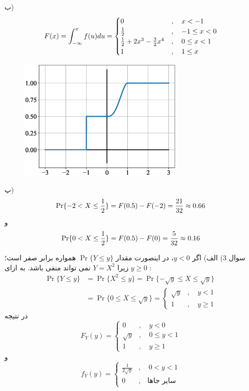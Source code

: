 \documentclass[10pt,letterpaper]{report}
\begin{document}
ب)
$$
F(x)=\int_{-\infty}^xf(u)du=\begin{cases}
0&,\quad x<-1\\
{1\over 2}&,\quad -1\le x<0\\
{1\over 2}+2x^3-{3\over 2}x^4&,\quad 0\le x<1\\
1&,\quad 1\le x
\end{cases}
$$
\begin{figure}[htbp]
\centering
\includegraphics[width=80mm]{CDF_HW9.eps}
\end{figure}

پ)
$$
\Pr\{-2< X\le {1\over2}\}=F(0.5)-F(-2)={21\over 32}\approx0.66
$$
و
$$
\Pr\{0< X\le {1\over2}\}=F(0.5)-F(0)={5\over 32}\approx0.16
$$

سوال 3) الف) اگر $y<0$، در اینصورت مقدار 
$
\Pr\{Y\le y\}
$
همواره برابر صفر است؛ زیرا 
$
Y=X^2
$
نمی تواند منفی باشد. به ازای 
$
y\ge 0
$
:
\[
\begin{split}
\Pr\{Y\le y\}&=\Pr\{X^2\le y\}
=\Pr\{-\sqrt y\le X\le \sqrt y\}
\\&=\Pr\{0\le X\le \sqrt y\}=\begin{cases}
\sqrt y&,\quad y<1\\
1&,\quad y\ge1
\end{cases}
\end{split}
\]
در نتیجه
$$
F_Y(y)=\begin{cases}
0&,\quad y<0\\
\sqrt y&,\quad 0\le y<1\\
1&,\quad y\ge1
\end{cases}
$$
و
$$
f_Y(y)=\begin{cases}
\frac{1}{2\sqrt y}&,\quad 0<y<1\\
0&,\quad \text{سایر جاها}
\end{cases}
$$
\end{document}
